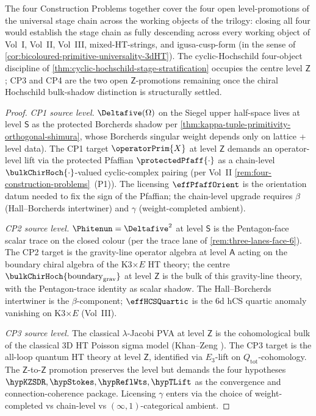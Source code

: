\begin{theorem}
\begin{center}
\end{center}
The four Construction Problems together cover the four open
level-promotions of the universal stage chain across the working
objects of the trilogy: closing all four would establish the
stage chain as fully descending across every working object of
Vol~I, Vol~II, Vol~III, mixed-HT-strings, and igusa-cusp-form
\textup(in the sense of \cref{cor:bicoloured-primitive-universality-3dHT}\textup).
The cyclic-Hochschild four-object discipline of
\cref{thm:cyclic-hochschild-stage-stratification} occupies the
centre level $\mathsf Z$; CP3 and CP4 are the two open
$\mathsf Z$-promotions remaining once the chiral Hochschild
bulk-shadow distinction is structurally settled.
\end{theorem}

\begin{proof}
\emph{CP1 source level.} $\Deltafive(\Omega)$ on the Siegel upper
half-space lives at level $\mathsf S$ as the protected Borcherds
shadow per
\cref{thm:kappa-tuple-primitivity-orthogonal-shimura}, whose
Borcherds singular weight depends only on lattice + level
data). The CP1 target $\operatorPrim{X}$ at level $\mathsf Z$
demands an operator-level lift via the protected Pfaffian
$\protectedPfaff{\cdot}$ as a chain-level
$\bulkChirHoch{\cdot}$-valued cyclic-complex pairing
\textup(per Vol~II \cref{rem:four-construction-problems}~(P1)\textup).
The licensing $\effPfaffOrient$ is the orientation datum needed to
fix the sign of the Pfaffian; the chain-level upgrade requires
$\beta$ (Hall--Borcherds intertwiner) and $\gamma$
(weight-completed ambient).

\emph{CP2 source level.} $\Phitenun = \Deltafive^2$ at level
$\mathsf S$ is the Pentagon-face scalar trace on the closed colour
\textup(per the trace lane of
\cref{rem:three-lanes-face-6}\textup). The CP2 target is the
gravity-line operator algebra at level $\mathsf A$ acting on the
boundary chiral algebra of the K3$\times E$ HT theory; the centre
$\bulkChirHoch{\mathrm{boundary}_{\mathrm{grav}}}$ at level $\mathsf
Z$ is the bulk of this gravity-line theory, with the
Pentagon-trace identity as scalar shadow. The Hall--Borcherds
intertwiner is the $\beta$-component; $\effHCSQuartic$ is the
6d hCS quartic anomaly vanishing on K3$\times E$ \textup(Vol~III\textup).

\emph{CP3 source level.} The classical $\lambda$-Jacobi PVA at
level $\mathsf Z$ is the cohomological bulk of the classical 3D HT
Poisson sigma model \textup(Khan--Zeng \cite{KZ25}\textup). The CP3
target is the all-loop quantum HT theory at level $\mathsf Z$,
identified via $E_3$-lift on $Q_{\mathrm{tot}}$-cohomology. The
$\mathsf Z$-to-$\mathsf Z$ promotion preserves the level but
demands the four hypotheses $\hypKZSDR, \hypStokes, \hypReflWts,
\hypTLift$ as the convergence and connection-coherence package.
Licensing $\gamma$ enters via the choice of weight-completed vs
chain-level vs $(\infty, 1)$-categorical ambient.


\end{proof}
